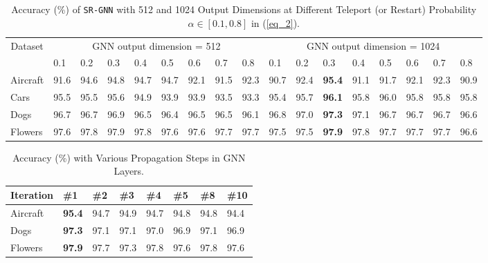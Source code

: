 \documentclass[journal]{IEEEtran}
\begin{document}
\begin{table*} 
\begin{center}
 \caption{Accuracy (\%) of \texttt{SR-GNN} with 512 and 1024 Output Dimensions at Different Teleport (or Restart) Probability $\alpha \in [0.1, 0.8]$ in (\ref{eq_2}).  }
 \label{table:APPNP_alpha2}
 \begin{small}
\begin{tabular}{|l|p{4.0 mm} p{4.5 mm} p{4.5 mm} p{4.5 mm} p{4.5 mm} p{4.5 mm} p{5 mm} p{5 mm}| p{4.0 mm} p{4.5 mm} p{4.5 mm} p{4.5 mm} p{4.5 mm} p{4.5 mm} p{5 mm} p{5 mm}| }
 \hline
 \multicolumn{1}{|c|}{Dataset} &
 \multicolumn{8}{|c|}{GNN output dimension = 512}  & \multicolumn{8}{|c|}{GNN output dimension = 1024} \\
 & 0.1 & 0.2 & 0.3 & 0.4 & 0.5 & 0.6 & 0.7 & 0.8 & 0.1 & 0.2 & 0.3 & 0.4 & 0.5 & 0.6 & 0.7 & 0.8     \\ 
    \hline
  Aircraft &  91.6 &94.6 & 94.8 &94.7 &94.7 &92.1 &91.5 & 92.3 
  & 90.7 & 92.4 & \textbf{95.4} & 91.1 & 91.7 &92.1 &92.3 &90.9 \\
   Cars & 95.5 & 95.5 & 95.6 &94.9 & 93.9 & 93.9 &93.5 & 93.3
   & 95.4 & 95.7 & \textbf{96.1} & 95.8 & 96.0 &95.8 & 95.8 & 95.8\\
  Dogs & 96.7 & 96.7 & 96.9 &96.5 & 96.4 & 96.5 &96.5 & 96.1
    & 96.8 & 97.0 & \textbf{97.3} & 97.1 & 96.7 &96.7 &96.7 & 96.6\\ 
  Flowers & 97.6 & 97.8 & 97.9 & 97.8 & 97.6 &97.6 &97.7 & 97.7
  & 97.5 & 97.5 & \textbf{97.9} & 97.8 & 97.7 & 97.7 & 97.7 & 96.6\\
\hline
\end{tabular}
\end{small}
 \end{center}
 \vspace{-0.5cm}
\end{table*}
\begin{table}[h]
\begin{center}
 \caption{Accuracy (\%) with Various Propagation Steps in GNN Layers. }
\begin{tabular}{|l| p{4.5 mm} p{4.5 mm} p{4.5 mm} p{4.5 mm} p{4.5 mm} p{4.5 mm} p{4.5 mm}| }
 \hline
Iteration & \#1 &\#2 &\#3  &\#4 &\#5 &\#8 &\#10 \\
    \hline
Aircraft & \textbf{95.4} &94.7 &94.9  &94.7 &94.8 &94.8 &94.4\\
Dogs & \textbf{97.3} &97.1 &97.1 &97.0 &96.9 &97.1 &96.9  \\
Flowers & \textbf{97.9}  &97.7 &97.3 &97.8 & 97.6 &97.8 &97.6\\ 
\hline
\end{tabular}
 \label{table:iter}
 \end{center}
 \vspace{- 0.5 cm}
\end{table}
\end{document}

